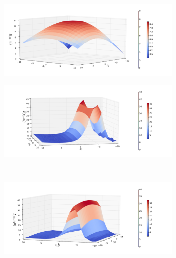 \FloatBarrier
\begin{figure}
	\begin{subfigure}{.4\textwidth}
		\centering
			\includegraphics[width=1\linewidth]{./figures/basket_call_2d_time_stepping/integrand_plotting/N_8/2d_plots/z_2_3/smoothed_integrand_basket_2D_N_8_z2_3_40}
		\caption{}
	\end{subfigure}%
	\begin{subfigure}{.4\textwidth}
		\centering
			\includegraphics[width=1\linewidth]{./figures/basket_call_2d_time_stepping/integrand_plotting/N_8/2d_plots/z_2_9/smoothed_integrand_basket_2D_N_8_z2_9_80}
		\caption{}
	\end{subfigure}\\[1ex]
	\begin{subfigure}{.4\textwidth}
		\centering
			\includegraphics[width=1\linewidth]{./figures/basket_call_2d_time_stepping/integrand_plotting/N_8/2d_plots/z_9_10/smoothed_integrand_basket_2D_N_8_z9_10_200}

\end{subfigure}
\end{figure}

